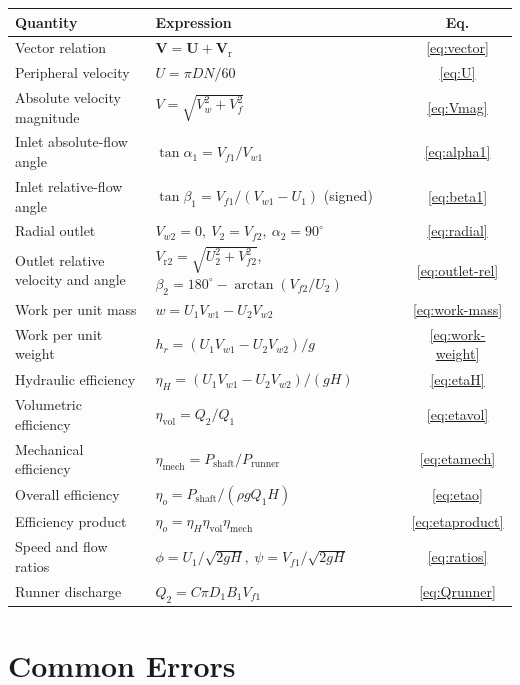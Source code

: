 \documentclass[11pt,a4paper]{article}
\numberwithin{equation}{section}
\newcommand{\vr}{\mathrm{r}}
\newcommand{\vvec}[1]{\bm{#1}}
\begin{document}
\begin{center}
\begin{tabular}{@{}p{5.2cm}p{6.6cm}c@{}}
\toprule
Quantity & Expression & Eq.\\
\midrule
Vector relation & $\vvec{V} = \vvec{U} + \vvec{V}_\vr$ & \eqref{eq:vector}\\
Peripheral velocity & $U = \pi D N/60$ & \eqref{eq:U}\\
Absolute velocity magnitude & $V = \sqrt{V_w^2 + V_f^2}$ & \eqref{eq:Vmag}\\
Inlet absolute-flow angle & $\tan\alpha_1 = V_{f1}/V_{w1}$ & \eqref{eq:alpha1}\\
Inlet relative-flow angle & $\tan\beta_1 = V_{f1}/(V_{w1}-U_1)$ (signed) & \eqref{eq:beta1}\\
Radial outlet & $V_{w2}=0,\ V_2=V_{f2},\ \alpha_2=90^\circ$ & \eqref{eq:radial}\\
Outlet relative velocity and angle & $V_{\vr 2}=\sqrt{U_2^2+V_{f2}^2}$, $\beta_2=180^\circ-\arctan(V_{f2}/U_2)$ & \eqref{eq:outlet-rel}\\
Work per unit mass & $w = U_1V_{w1}-U_2V_{w2}$ & \eqref{eq:work-mass}\\
Work per unit weight & $h_r = (U_1V_{w1}-U_2V_{w2})/g$ & \eqref{eq:work-weight}\\
Hydraulic efficiency & $\eta_H = (U_1V_{w1}-U_2V_{w2})/(gH)$ & \eqref{eq:etaH}\\
Volumetric efficiency & $\eta_{\mathrm{vol}} = Q_2/Q_1$ & \eqref{eq:etavol}\\
Mechanical efficiency & $\eta_{\mathrm{mech}} = P_{\mathrm{shaft}}/P_{\mathrm{runner}}$ & \eqref{eq:etamech}\\
Overall efficiency & $\eta_o = P_{\mathrm{shaft}}/(\rho gQ_1H)$ & \eqref{eq:etao}\\
Efficiency product & $\eta_o = \eta_H\eta_{\mathrm{vol}}\eta_{\mathrm{mech}}$ & \eqref{eq:etaproduct}\\
Speed and flow ratios & $\phi = U_1/\sqrt{2gH},\ \psi = V_{f1}/\sqrt{2gH}$ & \eqref{eq:ratios}\\
Runner discharge & $Q_2 = C\pi D_1B_1V_{f1}$ & \eqref{eq:Qrunner}\\
\bottomrule
\end{tabular}
\label{tab:formulae}
\end{center}

\section{Common Errors}
\label{sec:errors}
\end{document}
